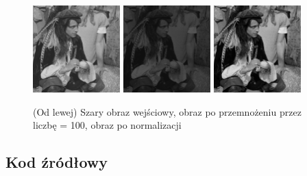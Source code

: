 \documentclass[final,a4paper,openany,12pt]{mwbk}
\begin{document}
\begin{figure}[H]
	\begin{center}
		\includegraphics[width=0.3\textwidth]{2/2Gray_Const_Multipl_Original}
		\includegraphics[width=0.3\textwidth]{2/2Gray_Const_Multipl_Result}
		\includegraphics[width=0.3\textwidth]{2/2Gray_Const_Multipl_Result_Norm}
	\end{center}
	\caption{(Od lewej) Szary obraz wejściowy, obraz po przemnożeniu przez liczbę = 100, obraz po normalizacji }
\end{figure}

\subsection*{Kod źródłowy}
\end{document}
